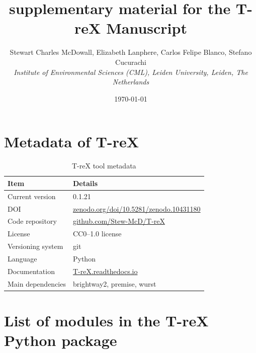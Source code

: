 \documentclass{article}
\begin{document}
\title{\textbf{supplementary material for the T-reX Manuscript}}
\author{Stewart Charles McDowall, Elizabeth Lanphere, Carlos Felipe Blanco, Stefano Cucurachi \\
\textit{Institute of Environmental Sciences (CML), Leiden University, Leiden, The Netherlands}}
\date{\today}

\maketitle
\tableofcontents
\listoffigures
\listoftables
\clearpage

\section{Metadata of T-reX}

\begin{table}[h]
    \caption{T-reX tool metadata}\label{tab:metadata}
    \centering
    \begin{tabular}{ll}
    \toprule
    \textbf{Item} & \textbf{Details} \\
    \midrule
    Current version & 0.1.21 \\
    DOI & \url{zenodo.org/doi/10.5281/zenodo.10431180} \\
    Code repository & \url{github.com/Stew-McD/T-reX} \\
    License & CC0--1.0 license \\
    Versioning system & git \\
    Language & Python \\
    Documentation & \url{T-reX.readthedocs.io} \\
    Main dependencies & brightway2, premise, wurst \\
    \bottomrule
    \end{tabular}
\end{table}

\section{List of modules in the T-reX Python package}
\end{document}
